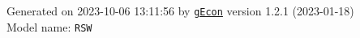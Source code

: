 \documentclass[10pt,a4paper]{article}
\numberwithin{equation}{section}
\begin{document}
\begin{landscape}
\begin{flushleft}{\large
Generated  on 2023-10-06 13:11:56 by \href{http://gecon.r-forge.r-project.org/}{\texttt{gEcon}} version 1.2.1 (2023-01-18)\\
Model name: \verb+RSW+
}\end{flushleft}


\end{landscape}

\end{document}
